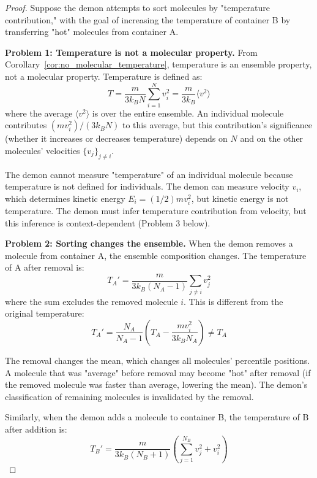 \documentclass[12pt,a4paper]{article}
\theoremstyle{definition}
\theoremstyle{remark}
\begin{document}
\begin{proof}
Suppose the demon attempts to sort molecules by "temperature contribution," with the goal of increasing the temperature of container B by transferring "hot" molecules from container A.

\textbf{Problem 1: Temperature is not a molecular property.}
From Corollary~\ref{cor:no_molecular_temperature}, temperature is an ensemble property, not a molecular property. Temperature is defined as:
\begin{equation}
T = \frac{m}{3k_B N} \sum_{i=1}^N v_i^2 = \frac{m}{3k_B} \langle v^2 \rangle
\end{equation}
where the average $\langle v^2 \rangle$ is over the entire ensemble. An individual molecule contributes $(m v_i^2) / (3k_B N)$ to this average, but this contribution's significance (whether it increases or decreases temperature) depends on $N$ and on the other molecules' velocities $\{v_j\}_{j \neq i}$.

The demon cannot measure "temperature" of an individual molecule because temperature is not defined for individuals. The demon can measure velocity $v_i$, which determines kinetic energy $E_i = (1/2) m v_i^2$, but kinetic energy is not temperature. The demon must infer temperature contribution from velocity, but this inference is context-dependent (Problem 3 below).

\textbf{Problem 2: Sorting changes the ensemble.}
When the demon removes a molecule from container A, the ensemble composition changes. The temperature of A after removal is:
\begin{equation}
T_A' = \frac{m}{3k_B(N_A - 1)} \sum_{j \neq i} v_j^2
\end{equation}
where the sum excludes the removed molecule $i$. This is different from the original temperature:
\begin{equation}
T_A' = \frac{N_A}{N_A - 1} \left(T_A - \frac{m v_i^2}{3k_B N_A}\right) \neq T_A
\end{equation}

The removal changes the mean, which changes all molecules' percentile positions. A molecule that was "average" before removal may become "hot" after removal (if the removed molecule was faster than average, lowering the mean). The demon's classification of remaining molecules is invalidated by the removal.

Similarly, when the demon adds a molecule to container B, the temperature of B after addition is:
\begin{equation}
T_B' = \frac{m}{3k_B(N_B + 1)} \left(\sum_{j=1}^{N_B} v_j^2 + v_i^2\right)
\end{equation}


\end{proof}
\end{document}
